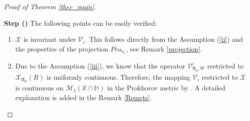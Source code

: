 \documentclass[english,a4paper,11pt]{amsart}
\theoremstyle{plain}
\theoremstyle{definition}
\theoremstyle{remark}
\numberwithin{equation}{section}
\newcounter{lil1}
\newenvironment{step}
{\begin{list} { \bf Step (\Roman{lil1})}
		{ \usecounter{lil1}
			\setlength{\leftmargin}{0.0cm}
			\setlength{\topsep}{0.2cm}
			\setlength{\itemsep}{0.0cm}
			\setlength{\parsep}{0.1cm}
			\setlength{\itemindent}{0.8cm}
			\setlength{\parskip}{0.0cm}}}
	{\end{list}}
\newcounter{lil33}
\newcounter{lil1q}
\newcommand{\X}{\mathbb{X}}
\newcommand{\Pro}{Pro}
\begin{document}
\begin{proof}[Proof of Theorem \ref{ther_main}]
\begin{step}
The following points can be easily verified:
\begin{enumerate}[(1)]
%
\item\label{1p}  $\mathscr{X}$  is invariant under $\mathscr{V}_\iota$.
This follows directly from the Assumption (\ref{ii})
and the properties of the projection $\Pro_{n_\iota}$, see Remark \ref{projection}.

\item\label{02} {Due to the Assumption (\ref{iii}), we know that the operator $\mathcal{V}_{\mathfrak{A}_\mu,W}^\iota$ restricted to $\mathcal{X}_{\mathfrak{A}_\mu}(R)$	is uniformly continuous. Therefore, the mapping $\mathscr{V}_\iota$ restricted to $\mathscr{X}$ is continuous
	on $\mathscr{M}_1(\X \cap\mathbb{H})$ in the Prokhorov metric by \cite[Theorem 11.7.1]{dudley2002}. A detailed explanation is added in the Remark \ref{Remcts}.}


\end{enumerate}
\end{step}
\end{proof}
\end{document}
